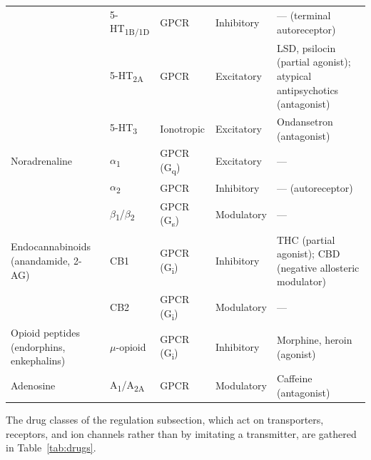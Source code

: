 \documentclass[11pt]{article}
\begin{document}
{\begin{longtable}{L{2.9cm} L{2.4cm} L{1.8cm} L{1.9cm} L{4.0cm}}
 & 5-HT\textsubscript{1B/1D} & GPCR & Inhibitory & --- (terminal autoreceptor) \\
 & 5-HT\textsubscript{2A} & GPCR & Excitatory & LSD, psilocin (partial agonist); atypical antipsychotics (antagonist) \\
 & 5-HT\textsubscript{3} & Ionotropic & Excitatory & Ondansetron (antagonist) \\
\midrule
Noradrenaline & $\alpha$\textsubscript{1} & GPCR (G\textsubscript{q}) & Excitatory & --- \\
 & $\alpha$\textsubscript{2} & GPCR & Inhibitory & --- (autoreceptor) \\
 & $\beta$\textsubscript{1}/$\beta$\textsubscript{2} & GPCR (G\textsubscript{s}) & Modulatory & --- \\
\midrule
Endocannabinoids (anandamide, 2-AG) & CB1 & GPCR (G\textsubscript{i}) & Inhibitory & THC (partial agonist); CBD (negative allosteric modulator) \\
 & CB2 & GPCR (G\textsubscript{i}) & Modulatory & --- \\
\midrule
Opioid peptides (endorphins, enkephalins) & $\mu$-opioid & GPCR (G\textsubscript{i}) & Inhibitory & Morphine, heroin (agonist) \\
\midrule
Adenosine & A\textsubscript{1}/A\textsubscript{2A} & GPCR & Modulatory & Caffeine (antagonist) \\
\end{longtable}
}

The drug classes of the regulation subsection, which act on transporters, receptors, and ion channels rather than by imitating a transmitter, are gathered in Table~\ref{tab:drugs}.
\end{document}
